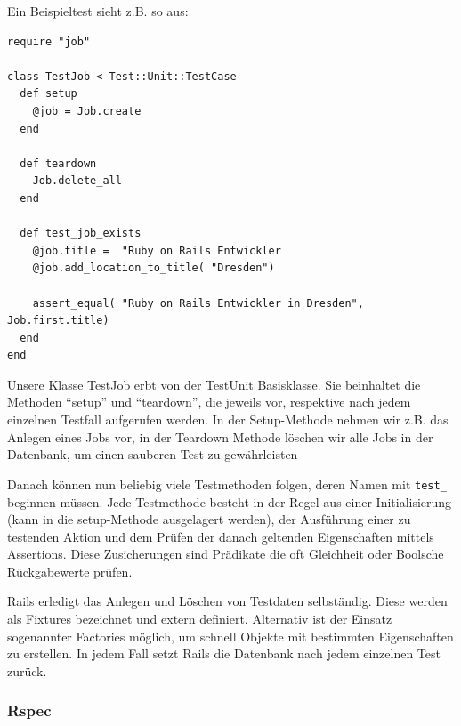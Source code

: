 Ein Beispieltest sieht z.B. so aus:
\begin{lstlisting}
require "job"

class TestJob < Test::Unit::TestCase
  def setup
    @job = Job.create
  end
  
  def teardown
    Job.delete_all
  end
  
  def test_job_exists
    @job.title =  "Ruby on Rails Entwickler
    @job.add_location_to_title( "Dresden")
    
    assert_equal( "Ruby on Rails Entwickler in Dresden",  Job.first.title)
  end
end
\end{lstlisting}
Unsere Klasse TestJob erbt von der TestUnit Basisklasse. Sie beinhaltet die Methoden "`setup"' und "`teardown"', die jeweils vor, respektive nach jedem einzelnen Testfall aufgerufen werden.
In der Setup-Methode nehmen wir z.B. das Anlegen eines Jobs vor, in der Teardown Methode löschen wir alle Jobs in der Datenbank, um einen sauberen Test zu gewährleisten

Danach können nun beliebig viele Testmethoden folgen, deren Namen mit \texttt{test\_} beginnen müssen.
Jede Testmethode besteht in der Regel aus einer Initialisierung (kann in die setup-Methode ausgelagert werden), der Ausführung einer zu testenden Aktion und dem Prüfen der danach geltenden Eigenschaften mittels Assertions. Diese Zusicherungen sind Prädikate die oft Gleichheit oder Boolsche Rückgabewerte prüfen.


Rails erledigt das Anlegen und Löschen von Testdaten selbständig. Diese werden als Fixtures bezeichnet und extern definiert. Alternativ ist der Einsatz sogenannter Factories möglich, um schnell Objekte mit bestimmten Eigenschaften zu erstellen. In jedem Fall setzt Rails die Datenbank nach jedem einzelnen Test zurück.


\subsubsection{Rspec}

